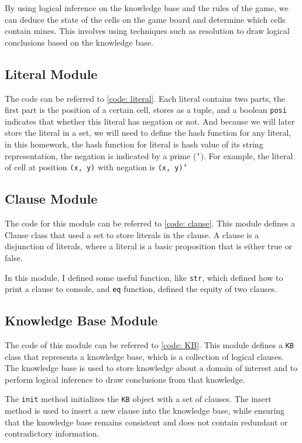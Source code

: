 \documentclass[twocolumn]{extarticle}
\begin{document}
By using logical inference on the knowledge base and the rules of the game, we can deduce the state of the cells on the game board and determine which cells contain mines. This involves using techniques such as resolution to draw logical conclusions based on the knowledge base.

\subsection{Literal Module}

The code can be referred to \autoref{code: literal}. Each literal contains two parts, the first part is the position of a certain cell, stores as a tuple, and a boolean \texttt{posi} indicates that whether this literal has negation or not. And because we will later store the literal in a set, we will need to define the hash function for any literal, in this homework, the hash function for literal is hash value of its string representation, the negation is indicated by a prime (\texttt{'}). For example, the literal of cell at position \texttt{(x, y)} with negation is \texttt{(x, y)'}

\subsection{Clause Module}

The code for this module can be referred to \autoref{code: clause}. This module defines a Clause class that used a set to store literals in the clause. A clause is a disjunction of literals, where a literal is a basic proposition that is either true or false.

In this module, I defined some useful function, like \texttt{str}, which defined how to print a clause to console, and \texttt{eq} function, defined the equity of two clauses. 


\subsection{Knowledge Base Module \label{sec:KB}}

The code of this module can be referred to \autoref{code: KB}. This module defines a \texttt{KB} class that represents a knowledge base, which is a collection of logical clauses. The knowledge base is used to store knowledge about a domain of interest and to perform logical inference to draw conclusions from that knowledge.

The \texttt{init} method initializes the \texttt{KB} object with a set of clauses. The insert method is used to insert a new clause into the knowledge base, while ensuring that the knowledge base remains consistent and does not contain redundant or contradictory information.
\end{document}
